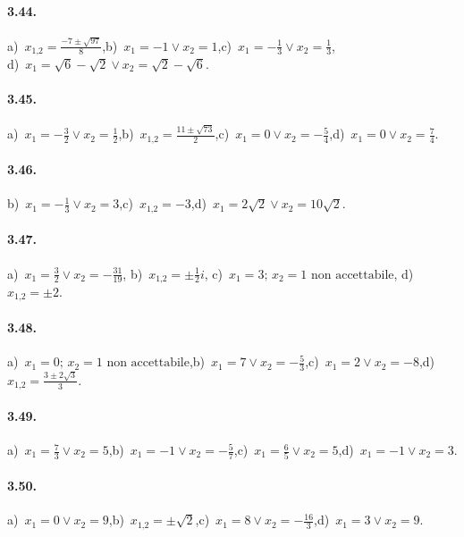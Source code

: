 \paragraph{3.44.} a)~$x_{1\text{,}2} = \frac{- 7 \pm \sqrt{97}}{8}$,\quad b)~$x_{1} =-1 \vee x_{2} = 1$,\quad c)~$x_{1} =-\frac{1}{3} \vee x_{2} = \frac{1}{3}$,\protect \\ \quad d)~$x_{1} = \sqrt{6}-\sqrt{2} \vee x_{2} = \sqrt{2}-\sqrt{6}$.

\paragraph{3.45.} a)~$x_{1} =-\frac{3}{2} \vee x_{2} = \frac{1}{2}$,\quad b)~$x_{1\text{,}2} = \frac{11 \pm \sqrt{73}}{2}$,\quad c)~$x_{1} = 0 \vee x_{2} =-\frac{5}{4}$,\quad d)~$x_{1} = 0 \vee x_{2} = \frac{7}{4}$.

\paragraph{3.46.} b)~$x_{1} =-\frac{1}{3} \vee x_{2} = 3$,\quad c)~$x_{1\text{,}2} = -3$,\quad d)~$x_{1} = 2\sqrt{2} \vee x_{2} =10\sqrt{2}$.

\paragraph{3.47.} a)~$x_{1} =\frac{3}{2} \vee x_{2} =-\frac{31}{19}$,\; b)~$x_{1\text{,}2} = \pm\frac{1}{2}i$,\; c)~$x_{1} =3;\,x_{2} =1\text{ non accettabile}$,\; d)~$x_{1\text{,}2} = \pm 2$.

\paragraph{3.48.} a)~$x_{1} =0;\,x_{2} =1\text{ non accettabile}$,\quad b)~$x_{1} =7 \vee x_{2} =-\frac{5}{3}$,\quad c)~$x_{1} =2 \vee x_{2} =-8$,\quad d)~$x_{1\text{,}2} = \frac{3 \pm 2\sqrt{3}}{3}$.

\paragraph{3.49.} a)~$x_{1} =\frac{7}{3} \vee x_{2} = 5$,\quad b)~$x_{1} =-1 \vee x_{2} = -\frac{5}{7}$,\quad c)~$x_{1} =\frac{6}{5} \vee x_{2} =5$,\quad d)~$x_{1} =-1 \vee x_{2} = 3$.

\paragraph{3.50.} a)~$x_{1} =0 \vee x_{2} = 9$,\quad b)~$x_{1\text{,}2} = \pm \sqrt{2}$,\quad c)~$x_{1} =8 \vee x_{2} =-\frac{16}{3}$,\quad d)~$x_{1} =3 \vee x_{2} = 9$.

